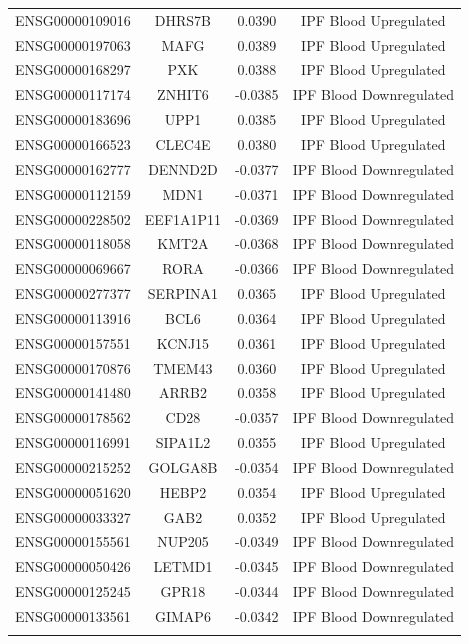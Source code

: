 \documentclass[
]{article}
\begin{document}
\begin{singlespace}
\begin{longtable}[t]{lccc}
\addlinespace
ENSG00000109016 & DHRS7B & 0.0390 & IPF Blood Upregulated\\
ENSG00000197063 & MAFG & 0.0389 & IPF Blood Upregulated\\
ENSG00000168297 & PXK & 0.0388 & IPF Blood Upregulated\\
ENSG00000117174 & ZNHIT6 & -0.0385 & IPF Blood Downregulated\\
ENSG00000183696 & UPP1 & 0.0385 & IPF Blood Upregulated\\
\addlinespace
ENSG00000166523 & CLEC4E & 0.0380 & IPF Blood Upregulated\\
ENSG00000162777 & DENND2D & -0.0377 & IPF Blood Downregulated\\
ENSG00000112159 & MDN1 & -0.0371 & IPF Blood Downregulated\\
ENSG00000228502 & EEF1A1P11 & -0.0369 & IPF Blood Downregulated\\
ENSG00000118058 & KMT2A & -0.0368 & IPF Blood Downregulated\\
\addlinespace
ENSG00000069667 & RORA & -0.0366 & IPF Blood Downregulated\\
ENSG00000277377 & SERPINA1 & 0.0365 & IPF Blood Upregulated\\
ENSG00000113916 & BCL6 & 0.0364 & IPF Blood Upregulated\\
ENSG00000157551 & KCNJ15 & 0.0361 & IPF Blood Upregulated\\
ENSG00000170876 & TMEM43 & 0.0360 & IPF Blood Upregulated\\
\addlinespace
ENSG00000141480 & ARRB2 & 0.0358 & IPF Blood Upregulated\\
ENSG00000178562 & CD28 & -0.0357 & IPF Blood Downregulated\\
ENSG00000116991 & SIPA1L2 & 0.0355 & IPF Blood Upregulated\\
ENSG00000215252 & GOLGA8B & -0.0354 & IPF Blood Downregulated\\
ENSG00000051620 & HEBP2 & 0.0354 & IPF Blood Upregulated\\
\addlinespace
ENSG00000033327 & GAB2 & 0.0352 & IPF Blood Upregulated\\
ENSG00000155561 & NUP205 & -0.0349 & IPF Blood Downregulated\\
ENSG00000050426 & LETMD1 & -0.0345 & IPF Blood Downregulated\\
ENSG00000125245 & GPR18 & -0.0344 & IPF Blood Downregulated\\
ENSG00000133561 & GIMAP6 & -0.0342 & IPF Blood Downregulated\\
\addlinespace

\end{longtable}
\end{singlespace}
\end{document}
